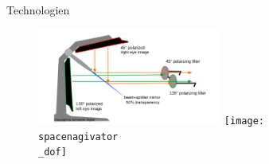 \documentclass[final,hyperref={pdfpagelabels=false}]{beamer}
\begin{document}
\begin{frame}[t]
\begin{columns}[t]
\begin{column}{.465\textwidth}
\begin{block}{Technologien}
   \begin{figure}
       \includegraphics[width=0.6\textwidth]{pluraviewTechnologie}
       \texttt{[image: spacenagivator\\\_dof]}
   \end{figure}
   
   
     
   
   
\end{block}


\vspace{0.125cm}

\end{column}


\begin{column}{.025\textwidth}\end{column} %

\begin{column}{0.465\textwidth}


\end{column}
\end{columns}
\end{frame}
\end{document}
